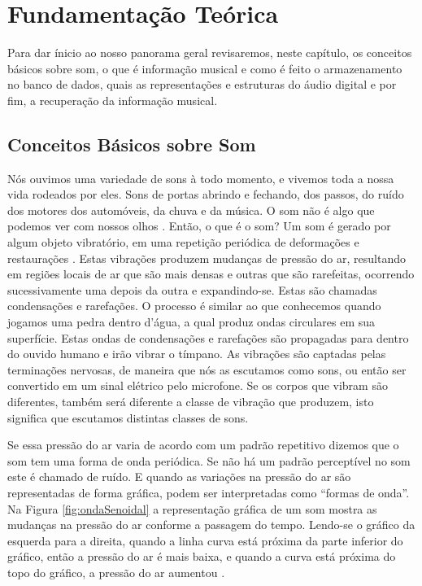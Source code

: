 \chapter{Fundamentação Teórica}
Para dar ínicio ao nosso panorama geral revisaremos, neste capítulo, os conceitos básicos sobre som, o que é informação musical e como é feito o armazenamento no banco de dados, quais as representações e estruturas do áudio digital e por fim, a recuperação da informação musical.

\section{Conceitos Básicos sobre Som}
Nós ouvimos uma variedade de sons à todo momento, e vivemos toda a nossa vida rodeados por eles. Sons de portas abrindo e fechando, dos passos, do ruído dos motores dos automóveis, da chuva e da música. O som não é algo que podemos ver com nossos olhos \cite{miletto2004}. Então, o que é o som? 
Um som é gerado por algum objeto vibratório, em uma repetição periódica de deformações e restaurações \cite{muller2007}. Estas vibrações produzem mudanças de pressão do ar, resultando em regiões locais de ar que são mais densas e outras que são rarefeitas, ocorrendo sucessivamente uma depois da outra e expandindo-se. Estas são chamadas condensações e rarefações. O processo é similar ao que conhecemos quando jogamos uma pedra dentro d’água, a qual produz ondas circulares em sua superfície. Estas ondas de condensações e rarefações são propagadas para dentro do ouvido humano e irão vibrar o tímpano. As vibrações são captadas pelas terminações nervosas, de maneira que nós as escutamos como sons, ou então ser convertido em um sinal elétrico pelo microfone. Se os corpos que vibram são diferentes, também será diferente a classe de vibração que produzem, isto significa que escutamos distintas classes de sons.

Se essa pressão do ar varia de acordo com um padrão repetitivo dizemos que o som tem uma forma de onda periódica. Se não há um padrão perceptível no som este é chamado de ruído. E quando as variações na pressão do ar são representadas de forma gráfica, podem ser interpretadas como “formas de onda”. Na Figura \ref{fig:ondaSenoidal} a representação gráfica de um som mostra as mudanças na pressão do ar conforme a passagem do tempo. Lendo-se o gráfico da esquerda para a direita, quando a linha curva está próxima da parte inferior do gráfico, então a pressão do ar é mais baixa, e quando a curva está próxima do topo do gráfico, a pressão do ar aumentou \cite{miletto2004}.

